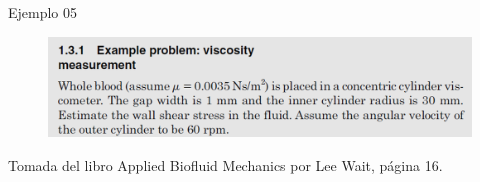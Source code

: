 \begin{frame}{Ejemplo 05}
\justifying
\begin{figure}[H]
\centering
\includegraphics[scale=0.35]{Section_Files/picmanuel/29.png}
\label{fig: Figura2-27}
\end{figure}
\begin{figure}
\centering
{}
\label{f:ejemplo05}
\end{figure}
{\tiny Tomada del libro Applied Biofluid Mechanics por Lee Wait, página 16.}
\end{frame}


